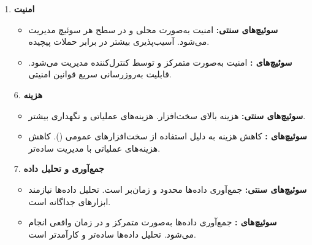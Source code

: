 \begin{qsolve}
\begin{enumerate}
		\item \textbf{امنیت}
		\begin{itemize}
			\item \textbf{سوئیچ‌های سنتی:} امنیت به‌صورت محلی و در سطح هر سوئیچ مدیریت می‌شود. آسیب‌پذیری بیشتر در برابر حملات پیچیده.
			\item \textbf{سوئیچ‌های :} امنیت به‌صورت متمرکز و توسط کنترل‌کننده مدیریت می‌شود. قابلیت به‌روزرسانی سریع قوانین امنیتی.
		\end{itemize}
	\end{enumerate}
\end{qsolve}
\newpage

\begin{qsolve}
	\begin{enumerate}
		\item [6. ] \textbf{هزینه}
		\begin{itemize}
			\item \textbf{سوئیچ‌های سنتی:} هزینه بالای سخت‌افزار. هزینه‌های عملیاتی و نگهداری بیشتر.
			\item \textbf{سوئیچ‌های :} کاهش هزینه به دلیل استفاده از سخت‌افزارهای عمومی (). کاهش هزینه‌های عملیاتی با مدیریت ساده‌تر.
		\end{itemize}
		
		\item [7. ] \textbf{جمع‌آوری و تحلیل داده}
		\begin{itemize}
			\item \textbf{سوئیچ‌های سنتی:} جمع‌آوری داده‌ها محدود و زمان‌بر است. تحلیل داده‌ها نیازمند ابزارهای جداگانه است.
			\item \textbf{سوئیچ‌های :} جمع‌آوری داده‌ها به‌صورت متمرکز و در زمان واقعی انجام می‌شود. تحلیل داده‌ها ساده‌تر و کارآمدتر است.
		\end{itemize}
	\end{enumerate}
\end{qsolve}